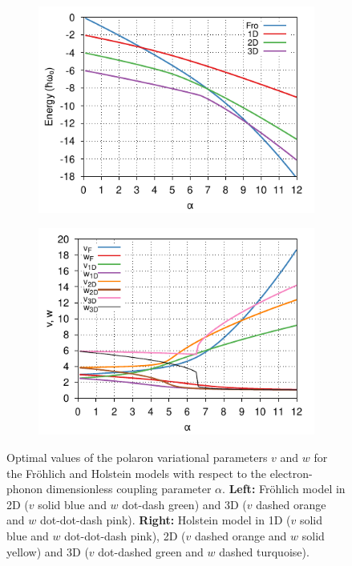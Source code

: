 \begin{figure}
  \begin{subfigure}[b]{0.49\textwidth}
    \includegraphics[width=\textwidth]{figures/holstein-alpha-energy-COLOUR.pdf}
  \end{subfigure}
  \begin{subfigure}[b]{0.49\textwidth}
    \includegraphics[width=\textwidth]{figures/holstein-alpha-vw-COLOUR.pdf}
  \end{subfigure}
  \caption{Optimal values of the polaron variational parameters $v$ and $w$ for the Fr\"ohlich and Holstein models with respect to the electron-phonon dimensionless coupling parameter $\alpha$. \textbf{Left:} Fr\"ohlich model in 2D ($v$ solid blue and $w$ dot-dash green) and 3D ($v$ dashed orange and $w$ dot-dot-dash pink). \textbf{Right:} Holstein model in 1D ($v$ solid blue and $w$ dot-dot-dash pink), 2D ($v$ dashed orange and $w$ solid yellow) and 3D ($v$ dot-dashed green and $w$ dashed turquoise).}
  \label{fig:vw_alpha}
\end{figure}

